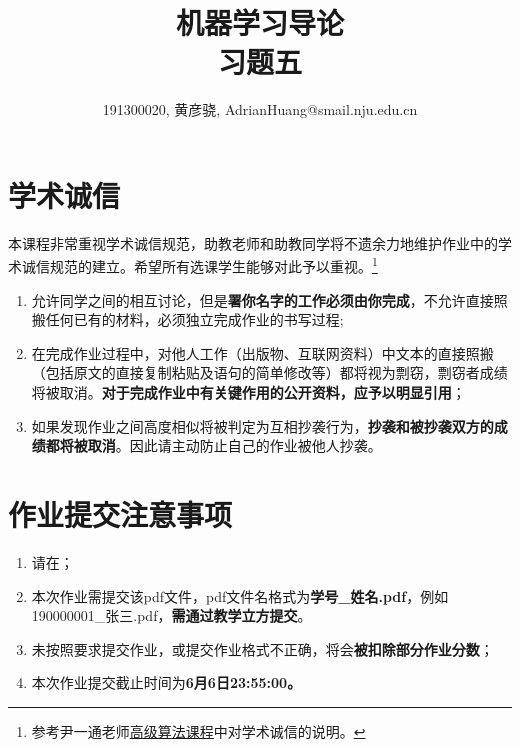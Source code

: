 \documentclass[a4paper,UTF8]{article}
\theoremstyle{definition}
\begin{document}
\title{机器学习导论\\
	习题五}
\author{191300020, 黄彦骁, AdrianHuang@smail.nju.edu.cn}
\maketitle


\section*{学术诚信}

本课程非常重视学术诚信规范，助教老师和助教同学将不遗余力地维护作业中的学术诚信规范的建立。希望所有选课学生能够对此予以重视。\footnote{参考尹一通老师\href{http://tcs.nju.edu.cn/wiki/}{高级算法课程}中对学术诚信的说明。}

\begin{tcolorbox}
	\begin{enumerate}
		\item[(1)] 允许同学之间的相互讨论，但是{\color{red}\textbf{署你名字的工作必须由你完成}}，不允许直接照搬任何已有的材料，必须独立完成作业的书写过程;
		\item[(2)] 在完成作业过程中，对他人工作（出版物、互联网资料）中文本的直接照搬（包括原文的直接复制粘贴及语句的简单修改等）都将视为剽窃，剽窃者成绩将被取消。{\color{red}\textbf{对于完成作业中有关键作用的公开资料，应予以明显引用}}；
		\item[(3)] 如果发现作业之间高度相似将被判定为互相抄袭行为，{\color{red}\textbf{抄袭和被抄袭双方的成绩都将被取消}}。因此请主动防止自己的作业被他人抄袭。
	\end{enumerate}
\end{tcolorbox}

\section*{作业提交注意事项}
\begin{tcolorbox}
	\begin{enumerate}
		\item[(1)] 请在；
		\item[(2)] 本次作业需提交该pdf文件，pdf文件名格式为{\color{red}\textbf{学号\_姓名.pdf}}，例如190000001\_张三.pdf，{\color{red}\textbf{需通过教学立方提交}}。
		\item[(3)] 未按照要求提交作业，或提交作业格式不正确，将会{\color{red}\textbf{被扣除部分作业分数}}；
		\item[(4)] 本次作业提交截止时间为{\color{red}\textbf{6月6日23:55:00。}}
	\end{enumerate}
\end{tcolorbox}
\end{document}
